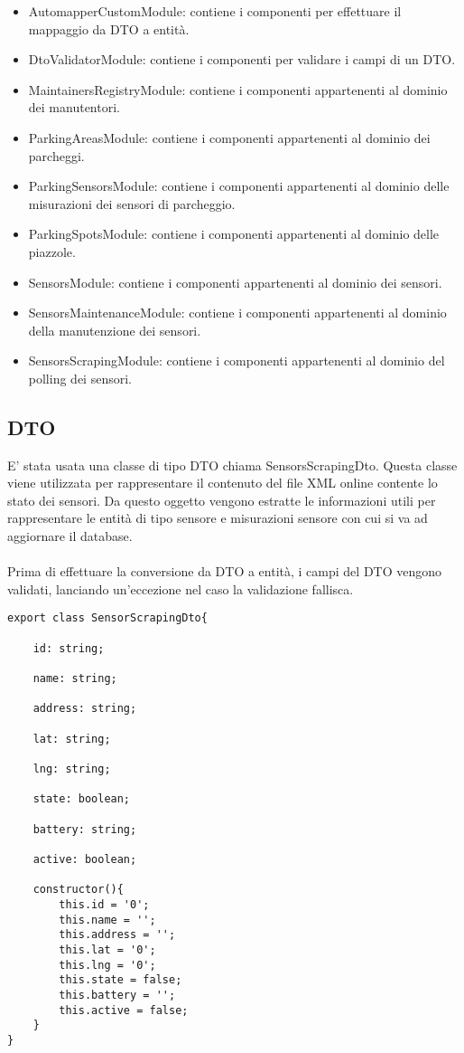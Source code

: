 \begin{itemize}
    \item AutomapperCustomModule: contiene i componenti per effettuare il mappaggio da DTO a entità.
    \item DtoValidatorModule: contiene i componenti per validare i campi di un DTO.
    \item MaintainersRegistryModule: contiene i componenti appartenenti al dominio dei manutentori.
    \item ParkingAreasModule: contiene i componenti appartenenti al dominio dei parcheggi.
    \item ParkingSensorsModule: contiene i componenti appartenenti al dominio delle misurazioni dei sensori di parcheggio.
    \item ParkingSpotsModule: contiene i componenti appartenenti al dominio delle piazzole.
    \item SensorsModule: contiene i componenti appartenenti al dominio dei sensori.
    \item SensorsMaintenanceModule: contiene i componenti appartenenti al dominio della manutenzione dei sensori.
    \item SensorsScrapingModule: contiene i componenti appartenenti al dominio del polling dei sensori.
\end{itemize}

\subsection{DTO}
E' stata usata una classe di tipo DTO chiama SensorsScrapingDto. Questa classe viene utilizzata per rappresentare
il contenuto del file XML online contente lo stato dei sensori. Da questo oggetto vengono estratte le informazioni
utili per rappresentare le entità di tipo sensore e misurazioni sensore con cui si va ad aggiornare il database.
\\\\
Prima di effettuare la conversione da DTO a entità, i campi del DTO vengono validati, lanciando un'eccezione nel caso 
la validazione fallisca.
\\
\begin{lstlisting}
export class SensorScrapingDto{
    
    id: string;

    name: string;

    address: string;

    lat: string;

    lng: string;

    state: boolean;

    battery: string;

    active: boolean;

    constructor(){
        this.id = '0';
        this.name = '';
        this.address = '';
        this.lat = '0';
        this.lng = '0';
        this.state = false;
        this.battery = '';
        this.active = false;
    }
}
\end{lstlisting}

